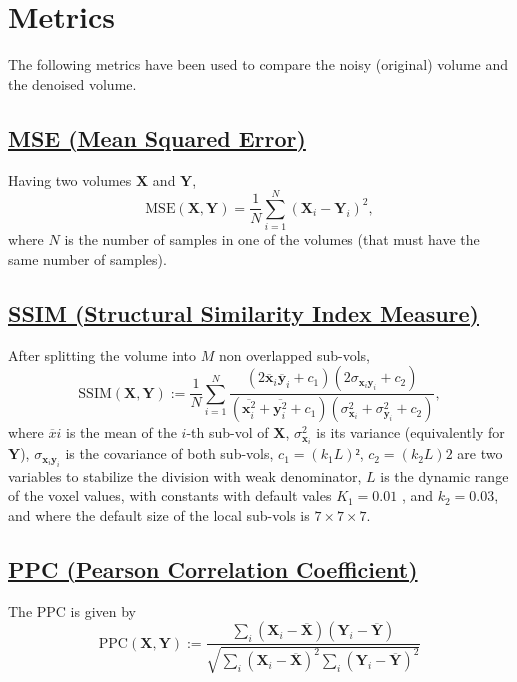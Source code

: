 \documentclass{article}
\begin{document}
\section{Metrics}

The following metrics have been used to compare the noisy (original)
volume and the denoised volume.

\subsection{\href{https://en.wikipedia.org/wiki/Mean_squared_error}{MSE (Mean
    Squared Error)}}

Having two volumes $\mathbf{X}$ and $\mathbf{Y}$,
\begin{equation}
  \text{MSE}(\mathbf{X},\mathbf{Y}) = \frac{1}{N}\sum_{i=1}^N(\mathbf{X}_i - \mathbf{Y}_i)^2,
\end{equation}
where $N$ is the number of samples in one of the volumes (that must
have the same number of samples).

\subsection{\href{https://en.wikipedia.org/wiki/Structural_similarity_index_measure}{SSIM
    (Structural Similarity Index Measure)}}

After splitting the volume into $M$ non overlapped sub-vols,
\begin{equation}
  \text{SSIM}(\mathbf{X}, \mathbf{Y}) := \frac{1}{N} \sum_{i=1}^N \frac{(2\overline{\mathbf{x}}_i \overline{\mathbf{y}}_i + c_1)(2\sigma_{\mathbf{x}_i \mathbf{y}_i} + c_2)}{(\overline{\mathbf{x}_i^2} + \overline{\mathbf{y}_i^2} + c_1)(\sigma^2_{\mathbf{x}_i} + \sigma^2_{\mathbf{y}_i} + c_2)},
\end{equation}
where $\overline{x}i$ is the mean of the $i$-th sub-vol of
$\mathbf{X}$, $\sigma^2_{\mathbf{x}_i}$ is its variance (equivalently
for $\mathbf{Y}$), $\sigma_{\mathbf{x}_i\mathbf{y}_i}$ is the
covariance of both sub-vols, $c_1=(k_1L) ²$, $c_2=(k_2L) 2$ are two
variables to stabilize the division with weak denominator, $L$ is the
dynamic range of the voxel values, with constants with default vales
$K_1=0.01$ , and $k_2=0.03$, and where the default size of the local
sub-vols is $7\times 7\times 7$.

\subsection{\href{https://en.wikipedia.org/wiki/Pearson_correlation_coefficient}{PPC
    (Pearson Correlation Coefficient)}}
The PPC is given by
\begin{equation}
  \text{PPC}(\mathbf{X}, \mathbf{Y}) := \frac{\sum_i(\mathbf{X}_i - \overline{\mathbf{X}})(\mathbf{Y}_i - \overline{\mathbf{Y}})}{\sqrt{\sum_i (\mathbf{X}_i - \overline{\mathbf{X}})^2 \sum_i (\mathbf{Y}_i - \overline{\mathbf{Y}})^2}}
\end{equation}
\end{document}
